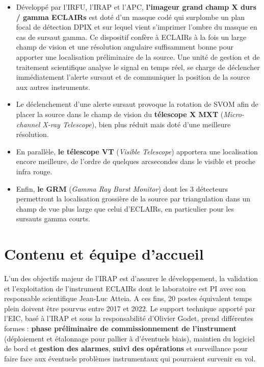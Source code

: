 \documentclass[12pt,onecolumn]{article}
\begin{document}
\begin{itemize}
\setlength\itemsep{0em}
\item Développé par l'IRFU, l'IRAP et l'APC, \textbf{l'imageur grand champ X durs / gamma ECLAIRs} est doté d'un masque codé qui surplombe un plan focal de détection DPIX et sur lequel vient s'imprimer l'ombre du masque en cas de sursaut gamma. Ce dispositif confère à ECLAIRs à la fois un large champ de vision et une résolution angulaire suffisamment bonne pour apporter une localisation préliminaire de la source. Une unité de gestion et de traitement scientifique analyse le signal en temps réel, se charge de déclencher immédiatement l'alerte sursaut et de communiquer la position de la source aux autres instruments.
\item Le déclenchement d'une alerte sursaut provoque la rotation de SVOM afin de placer la source dans le champ de vision du \textbf{télescope X MXT} (\textit{Micro-channel X-ray Telescope}), bien plus réduit mais doté d'une meilleure résolution. %
\item En parallèle, \textbf{le télescope VT} (\textit{Visible Telescope}) apportera une localisation encore meilleure, de l'ordre de quelques arcsecondes dans le visible et proche infra rouge. %
\item Enfin, \textbf{le GRM} (\textit{Gamma Ray Burst Monitor}) dont les 3 détecteurs permettront la localisation grossière de la source par triangulation dans un champ de vue plus large que celui d'ECLAIRs, en particulier pour les sursauts gamma courts. %
\end{itemize}

\section{Contenu et équipe d'accueil}

L'un des objectifs majeur de l'IRAP est d'assurer le développement, la validation et l'exploitation de l'instrument ECLAIRs dont le laboratoire est PI avec son responsable scientifique Jean-Luc Atteia. A ces fins, 20 postes équivalent temps plein doivent être pourvus entre 2017 et 2022. Le support technique apporté par l'EIC, basé à l'IRAP et sous la responsabilité d'Olivier Godet, prend différentes formes : \textbf{phase préliminaire de commissionnement de l'instrument} (déploiement et étalonnage pour pallier à d'éventuels biais), maintien du logiciel de bord et \textbf{gestion des alarmes}, \textbf{suivi des opérations} et surveillance pour faire face aux éventuels problèmes instrumentaux qui pourraient survenir en vol. 
\end{document}

